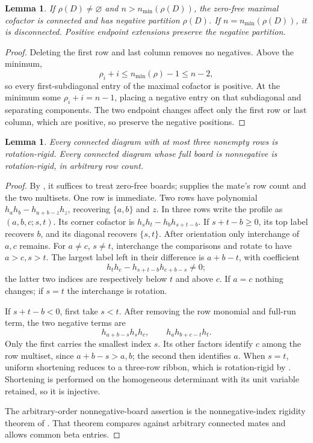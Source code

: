 \documentclass[11pt,a4paper]{amsart}
\numberwithin{equation}{section}
\theoremstyle{plain}
\newtheorem{lemma}[theorem]{Lemma}
\theoremstyle{definition}
\begin{document}
\begin{lemma}\label{lem:above-minimum-border}
If \(\rho(D)\ne\varnothing\) and \(n>n_{\min}(\rho(D))\), the zero-free maximal cofactor is connected and has negative partition \(\rho(D)\).  If \(n=n_{\min}(\rho(D))\), it is disconnected.  Positive endpoint extensions preserve the negative partition.
\end{lemma}

\begin{proof}
Deleting the first row and last column removes no negatives.  Above the minimum,
\[
 \rho_i+i\le n_{\min}(\rho)-1\le n-2,
\]
so every first-subdiagonal entry of the maximal cofactor is positive.  At the minimum some \(\rho_i+i=n-1\), placing a negative entry on that subdiagonal and separating components.  The two endpoint changes affect only the first row or last column, which are positive, so preserve the negative positions.
\end{proof}

\begin{lemma}\label{lem:small-rows}
Every connected diagram with at most three nonempty rows is rotation-rigid.
Every connected diagram whose full board is nonnegative is rotation-rigid,
in arbitrary row count.
\end{lemma}

\begin{proof}
By , it suffices to treat zero-free boards;
 supplies the mate's row count and the two multisets.
One row is immediate.  Two rows have polynomial \(h_a h_b-h_{a+b-z}h_z\), recovering
\(\{a,b\}\) and \(z\).  In three rows write the profile as
\((a,b,c;s,t)\).  Its corner cofactor is
\(h_s h_t-h_bh_{s+t-b}\).
If \(s+t-b\ge0\), its top label recovers \(b\), and its diagonal recovers
\(\{s,t\}\).  After orientation only interchange of \(a,c\) remains.
For \(a\ne c\), \(s\ne t\), interchange the comparisons and rotate to
have \(a>c,s>t\).  The largest label left in their difference is
\(a+b-t\), with coefficient
\[
 h_t h_c-h_{s+t-b}h_{c+b-s}\ne0;
\]
the latter two indices are respectively below \(t\) and above \(c\).
If \(a=c\) nothing changes; if \(s=t\) the interchange is rotation.

If \(s+t-b<0\), first take \(s<t\).  After removing the row monomial
and full-run term, the two negative terms are
\[
 h_{a+b-s}h_s h_c,\qquad h_a h_{b+c-t}h_t.
\]
Only the first carries the smallest index \(s\).  Its other factors
identify \(c\) among the row multiset, since \(a+b-s>a,b\); the second
then identifies \(a\).  When \(s=t\), uniform shortening reduces to a
three-row ribbon, which is rotation-rigid by
\cite{Billera2006DecomposableCompositions}.  Shortening is performed on
the homogeneous determinant with its unit variable retained, so it is
injective.

The arbitrary-order nonnegative-board assertion is the
nonnegative-index rigidity theorem of \cite{Shields2026Cofactor}.
That theorem compares against arbitrary connected mates and allows
common beta entries.
\end{proof}
\end{document}
